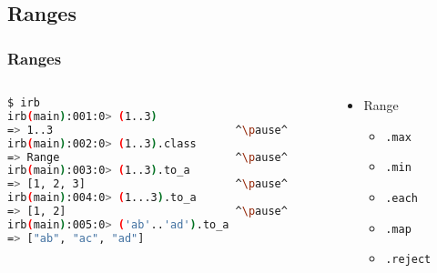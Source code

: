 \subsection{Ranges}
\begin{frame}[fragile]\frametitle{Ranges}

\begin{columns}[c] 

\begin{column}{7.5cm}
\begin{lstlisting}[language=bash, escapechar={^}]
$ irb
irb(main):001:0> (1..3)
=> 1..3                            ^\pause^
irb(main):002:0> (1..3).class
=> Range                           ^\pause^
irb(main):003:0> (1..3).to_a
=> [1, 2, 3]                       ^\pause^
irb(main):004:0> (1...3).to_a
=> [1, 2]                          ^\pause^
irb(main):005:0> ('ab'..'ad').to_a
=> ["ab", "ac", "ad"]
\end{lstlisting}
\end{column}

\pause

\begin{column}{4cm}
\begin{itemize}

\item Range
\begin{itemize}
\item \texttt{.max}
\item \texttt{.min}
\item \texttt{.each}
\item \texttt{.map}
\item \texttt{.reject}
\end{itemize}

\end{itemize}
\end{column}

\end{columns}

\end{frame}





